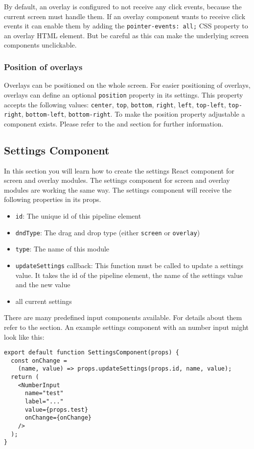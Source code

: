 By default, an overlay is configured to not receive any click events, because the current screen must handle them. 
If an overlay component wants to receive click events it can enable them by adding the \texttt{pointer-events: all;} CSS property to an overlay HTML element. 
But be careful as this can make the underlying screen components unclickable.

\subsubsection{Position of overlays}
Overlays can be positioned on the whole screen. 
For easier positioning of overlays, overlays can define an optional \texttt{position} property in its settings. 
This property accepts the following values: 
\texttt{center}, \texttt{top}, \texttt{bottom}, \texttt{right}, \texttt{left}, \texttt{top-left}, \texttt{top-right}, \texttt{bottom-left}, \texttt{bottom-right}.
To make the position property adjustable a  component exists. 
Please refer to the  and  section for further information.

\subsection{Settings Component}
\label{sec:settings-component}
In this section you will learn how to create the settings React component for screen and overlay modules.
The settings component for screen and overlay modules are working the same way. 
The settings component will receive the following properties in its props.
\begin{itemize}
  \item \texttt{id}: The unique id of this pipeline element
  \item \texttt{dndType}: The drag and drop type (either \texttt{screen} or \texttt{overlay})
  \item \texttt{type}: The name of this module
  \item \texttt{updateSettings} callback: This function must be called to update a settings value. 
    It takes the id of the pipeline element, the name of the settings value and the new value
  \item all current settings
\end{itemize}

There are many predefined input components available. 
For details about them refer to the  section. 
An example settings component with an number input might look like this:
\begin{verbatim}
export default function SettingsComponent(props) {
  const onChange = 
    (name, value) => props.updateSettings(props.id, name, value);
  return (
    <NumberInput 
      name="test" 
      label="..." 
      value={props.test} 
      onChange={onChange} 
    />
  );
}
\end{verbatim}

